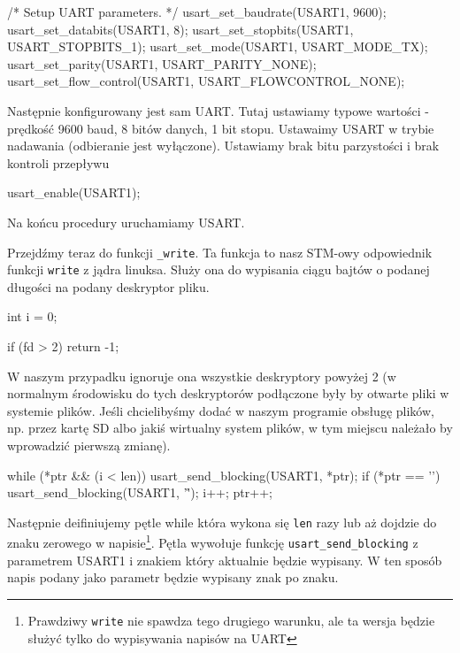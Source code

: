 \documentclass{pdfBooklets}
\begin{document}
\begin{CodeFrame*}[c]{}
        /* Setup UART parameters. */
	usart_set_baudrate(USART1, 9600);
	usart_set_databits(USART1, 8);
	usart_set_stopbits(USART1, USART_STOPBITS_1);
	usart_set_mode(USART1, USART_MODE_TX);
	usart_set_parity(USART1, USART_PARITY_NONE);
	usart_set_flow_control(USART1, USART_FLOWCONTROL_NONE);
\end{CodeFrame*}

Następnie konfigurowany jest sam UART. Tutaj ustawiamy typowe wartości - prędkość 9600 baud\footnotemark, 8 bitów danych, 1 bit stopu.
Ustawaimy USART w trybie nadawania (odbieranie jest wyłączone). Ustawiamy brak bitu parzystości i brak kontroli przepływu



\begin{CodeFrame*}[c]{}
  usart_enable(USART1);
\end{CodeFrame*}

Na końcu procedury uruchamiamy USART.


Przejdźmy teraz do funkcji \Verb$_write$. Ta funkcja to nasz STM-owy odpowiednik funkcji \Verb$write$ z jądra linuksa. Służy ona do wypisania ciągu
bajtów o podanej długości na podany deskryptor pliku.

\begin{CodeFrame*}[c]{}
  int i = 0;
  
  if (fd > 2) {
    return -1;
  }
\end{CodeFrame*}
W naszym przypadku ignoruje ona wszystkie deskryptory powyżej 2 (w normalnym środowisku do tych deskryptorów podłączone były by otwarte pliki w systemie
plików. Jeśli chcielibyśmy dodać w naszym programie obsługę plików, np. przez kartę SD albo jakiś wirtualny system plików, w tym miejscu
należało by wprowadzić pierwszą zmianę).
\begin{CodeFrame*}[c]{}
  while (*ptr && (i < len)) {
    usart_send_blocking(USART1, *ptr);
    if (*ptr == '\n') {
      usart_send_blocking(USART1, '\r');
    }
    i++; 
    ptr++;
  }
\end{CodeFrame*}

Następnie deifiniujemy pętle while która wykona się \Verb$len$ razy lub aż dojdzie do znaku zerowego w napisie\footnote{Prawdziwy \Verb$write$ nie
  spawdza tego drugiego warunku, ale ta wersja będzie służyć tylko do wypisywania napisów na UART}. Pętla wywołuje funkcję \Verb$usart_send_blocking$
z parametrem USART1 i znakiem który aktualnie będzie wypisany. W ten sposób napis podany jako parametr będzie wypisany znak po znaku.
\end{document}
